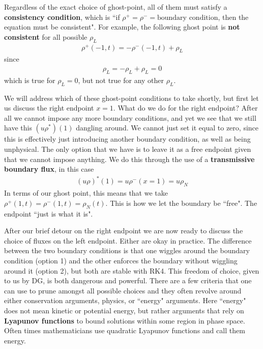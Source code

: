 \documentclass{report}
\numberwithin{equation}{section}
\begin{document}
Regardless of the exact choice of ghost-point, all of them must satisfy a \textbf{consistency condition}, which is ``if $\rho^+ = \rho^- = \text{boundary condition}$, then the equation must be consistent". For example, the following ghost point is \textbf{not consistent} for all possible $\rho_L$
\begin{align}
    \rho^+(-1,t) = - \rho^-(-1,t) +  \rho_L
\end{align}
since 
\begin{align}
    \rho_L = - \rho_L +  \rho_L = 0
\end{align}
which is true for $\rho_L = 0$, but not true for any other $\rho_L$.

We will address which of these ghost-point conditions to take shortly, but first let us discuss the right endpoint $x = 1$. What do we do for the right endpoint? After all we cannot impose any more boundary conditions, and yet we see that we still have this $(u\rho^*)(1)$ dangling around. We cannot just set it equal to zero, since this is effectively just introducing another boundary condition, as well as being unphysical. The only option that we have is to leave it as a free endpoint given that we cannot impose anything. We do this through the use of a \textbf{transmissive boundary flux}, in this case
\begin{align}
    (u \rho)^*(1) = u \rho^-(x = 1) = u \rho_N
\end{align}
In terms of our ghost point, this means that we take $ \rho^+(1,t) = \rho^-(1,t) = \rho_N(t)$. This is how we let the boundary be ``free". The endpoint ``just is what it is".  

After our brief detour on the right endpoint we are now ready to discuss the choice of fluxes on the left endpoint. Either are okay in practice. The difference between the two boundary conditions is that one wiggles around the boundary condition (option 1) and the other enforces the boundary without wiggling around it (option 2), but both are stable with RK4. This freedom of choice, given to us by DG, is both dangerous and powerful. There are a few criteria that one can use to prune amongst all possible choices and they often revolve around either conservation arguments, physics, or ``energy" arguments. Here ``energy" does not mean kinetic or potential energy, but rather arguments that rely on \textbf{Lyapunov functions} to bound solutions within some region in phase space. Often times mathematicians use quadratic Lyapunov functions and call them energy. 
\end{document}
